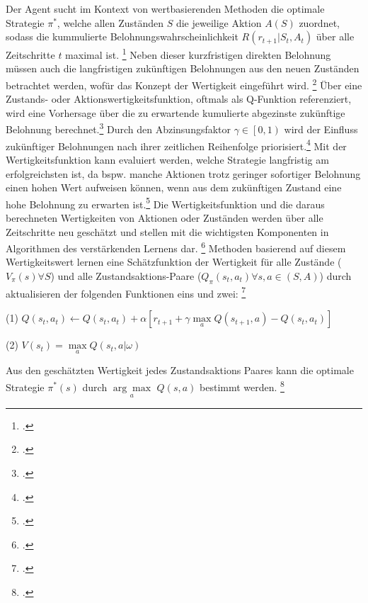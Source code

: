 Der Agent sucht im Kontext von wertbasierenden Methoden die optimale Strategie $\pi^{*}$, welche allen Zuständen $S$ die jeweilige Aktion $A(S)$ zuordnet, sodass die kummulierte Belohnungswahrscheinlichkeit $R(r_{t+1}|S_{t},A_{t})$ über alle Zeitschritte $t$ maximal ist. \footcite[Vgl.][S. 2]{Reda.2020}
Neben dieser kurzfristigen direkten Belohnung müssen auch die langfristigen zukünftigen Belohnungen aus den neuen Zuständen betrachtet werden, wofür das Konzept der Wertigkeit eingeführt wird. \footcite[Vgl.][S. 3]{Wang.2020}
Über eine Zustands- oder Aktionswertigkeitsfunktion, oftmals als Q-Funktion referenziert, wird eine Vorhersage über die zu erwartende kumulierte abgezinste zukünftige Belohnung berechnet.\footcite[Vgl.][S. 5]{Li.2019}
Durch den Abzinsungsfaktor $\gamma \in \left[0,1\right)$ wird der Einfluss zukünftiger Belohnungen nach ihrer zeitlichen Reihenfolge priorisiert.\footcite[Vgl][S. 5]{Li.2019}
Mit der Wertigkeitsfunktion kann evaluiert werden, welche Strategie langfristig am erfolgreichsten ist, da bspw. manche Aktionen trotz geringer sofortiger Belohnung einen hohen Wert aufweisen können, wenn aus dem zukünftigen Zustand eine hohe Belohnung zu erwarten ist.\footcite[Vgl.][S. 6]{Sutton.2018}
Die Wertigkeitsfunktion und die daraus berechneten Wertigkeiten von Aktionen oder Zuständen werden über alle Zeitschritte neu geschätzt und stellen mit die wichtigsten Komponenten in Algorithmen des verstärkenden Lernens dar. \footcite[Vgl.][S. 6f.]{Sutton.2018}
Methoden basierend auf diesem Wertigkeitswert lernen eine Schätzfunktion der Wertigkeit für alle Zustände ($V_{\pi}(s) \forall S$) und alle Zustandsaktions-Paare ($Q_{\pi}(s_{t},a_{t}) \forall s,a \in (S,A)$) durch aktualisieren der folgenden Funktionen eins und zwei: \footcite[Vgl.][S. 2]{Zhang.2018}
\begin{description}
    \item \begin{center} (1) $Q(s_{t}, a_{t}) \leftarrow Q(s_{t}, a_{t}) + \alpha\left[r_{t+1} + \gamma\max\limits_{a}Q(s_{t+1},a)-Q(s_{t},a_{t})\right]$ \end{center}
    \item \begin{center} (2) $V(s_{t}) = \max\limits_{a}Q(s_{t},a|\omega)$ \end{center}
\end{description}
Aus den geschätzten Wertigkeit jedes Zustandsaktions Paares kann die optimale Strategie $\pi^{*}(s)$ durch $\underset{a}{\arg\max}$ $Q(s,a)$ bestimmt werden. \footcite[Vgl.][S. 2]{Zhang.2018}

